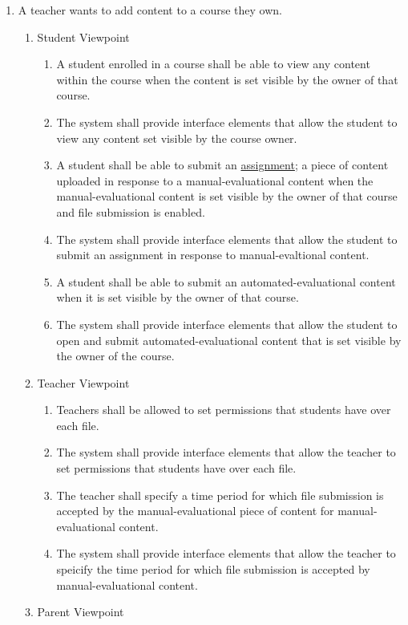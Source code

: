 \documentclass[]{article}
\begin{document}
\begin{enumerate}[{BE}1.]
	\item A teacher wants to add content to a course they own.
	\begin{enumerate}[{VP1}.1]
		\item Student Viewpoint
			\begin{enumerate}
        \item A student enrolled in a course shall be able to view any content 
within the course when the content is set visible by the owner of that course.
        \item The system shall provide interface elements that allow the student 
to view any content set visible by the course owner.
        \item A student shall be able to submit an \underline{assignment}; a 
piece of content uploaded in response to a manual-evaluational content when the 
manual-evaluational content is set visible by the owner of that course and file 
submission is enabled.
        \item The system shall provide interface elements that allow the student 
to submit an assignment in response to manual-evaltional content.
        \item A student shall be able to submit an automated-evaluational 
content when it is set visible by the owner of that course.
        \item The system shall provide interface elements that allow the student 
to open and submit automated-evaluational content that is set visible by the 
owner of the course.
			\end{enumerate}
		\item Teacher Viewpoint
			\begin{enumerate}
				\item Teachers shall be allowed to set permissions that students have over 
each file.
        \item The system shall provide interface elements that allow the teacher 
to set permissions that students have over each file.
				\item The teacher shall specify a time period for which file submission is 
accepted by the manual-evaluational piece of content for manual-evaluational 
content.
        \item The system shall provide interface elements that allow the teacher 
to speicify the time period for which file submission is accepted by 
manual-evaluational content.
			\end{enumerate}
		\item Parent Viewpoint

\end{enumerate}
\end{enumerate}
\end{document}
